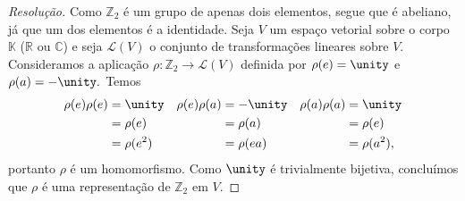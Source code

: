 \begin{proof}[Resolução]
    Como \(\mathbb{Z}_2\) é um grupo de apenas dois elementos, segue que é abeliano, já que um dos elementos é a identidade. Seja \(V\) um espaço vetorial sobre o corpo \(\mathbb{K}\) (\(\mathbb{R}\) ou \(\mathbb{C}\)) e seja \(\mathcal{L}(V)\) o conjunto de transformações lineares sobre \(V.\) Consideramos a aplicação \(\rho : \mathbb{Z}_2 \to \mathcal{L}(V)\) definida por \(\rho(e) = \unity\) e \(\rho(a) = -\unity.\) Temos
    \begin{align*}
        \rho(e) \rho(e) &= \unity&
        \rho(e) \rho(a) &= -\unity&
        \rho(a)\rho(a)  &= \unity\\
                            &= \rho(e)&
                            &= \rho(a)&
                            &= \rho(e)\\
                            &= \rho(e^2)&
                            &= \rho(ea)&
                            &= \rho(a^2),
    \end{align*}
    portanto \(\rho\) é um homomorfismo. Como \(\unity\) é trivialmente bijetiva, concluímos que \(\rho\) é uma representação de \(\mathbb{Z}_2\) em \(V.\)


\end{proof}
